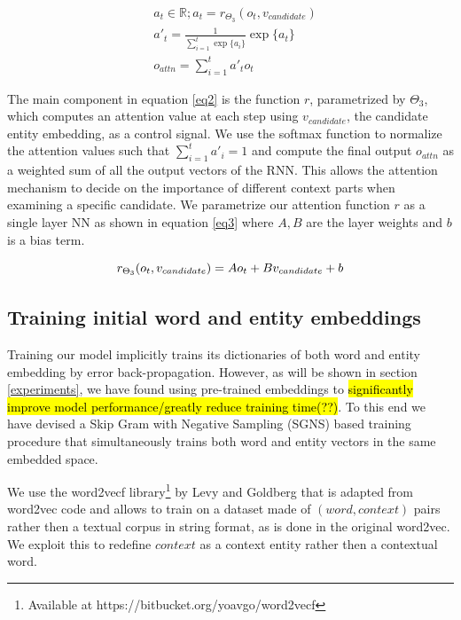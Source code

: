\documentclass[11pt]{article}
\begin{document}
\begin{equation}
\label{eq2}
\begin{aligned}
& a_t \in \mathbb{R}; a_t=r_{\Theta_3}(o_t, v_{candidate}) \\
& a'_t  = \frac{1}{\sum_{i=1}^{t} \exp\{a_i\}} \exp \{a_t\} \\
& o_{attn}=\sum_{i=1}^{t} a'_t o_t
\end{aligned}
\end{equation}

The main component in equation \ref{eq2} is the function $r$, parametrized by $\Theta_3$, which computes an attention value at each step using $v_{candidate}$, the candidate entity embedding, as a control signal. We use the softmax function to normalize the attention values such that $\sum_{i=1}^{t} a'_i = 1$ and compute the final output $o_{attn}$ as a weighted sum of all the output vectors of the RNN. This allows the attention mechanism to decide on the importance of different context parts when examining a specific candidate. We parametrize our attention function $r$ as a single layer NN as shown in equation \ref{eq3} where $A, B$ are the layer weights and $b$ is a bias term.

\begin{equation}
\label{eq3}
r_{\Theta_3}(o_t, v_{candidate}) = Ao_t + Bv_{candidate} + b \\
\end{equation}


\subsection{Training initial word and entity embeddings}

Training our model implicitly trains its dictionaries of both word and entity embedding by error back-propagation. However, as will be shown in section \ref{experiments}, we have found using pre-trained embeddings to \hl{significantly improve model performance/greatly reduce training time(??)}. To this end we have devised a Skip Gram with Negative Sampling (SGNS) \cite{mikolov2013distributed} based training procedure that simultaneously trains both word and entity vectors in the same embedded space.

We use the word2vecf library\footnote{Available at https://bitbucket.org/yoavgo/word2vecf} by Levy and Goldberg  that is adapted from word2vec code and allows to train on a dataset made of $(word,context)$ pairs rather then a textual corpus in string format, as is done in the original word2vec. We exploit this to redefine $context$ as a context entity rather then a contextual word. 
\end{document}
